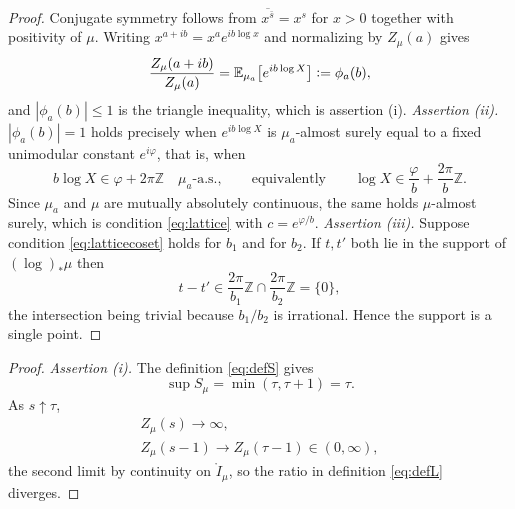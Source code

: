 \documentclass[sn-mathphys-num]{sn-jnl}
\theoremstyle{thmstyleone}%
\theoremstyle{thmstyletwo}%
\theoremstyle{thmstylethree}%
\theoremstyle{thmstyleone}%
\providecommand{\Z}{\mathbb{Z}}
\providecommand{\E}{\mathbb{E}}
\providecommand{\eqdef}{\mathrel{\vcentcolon=}}
\begin{document}
\begin{appendices}
		
		\propmodulus*
		
		\begin{proof}
			Conjugate symmetry follows from $\overline{x^{\bar s}}=x^{s}$ for
			$x>0$ together with positivity of $\mu$. Writing
			$x^{a+ib}=x^{a}e^{ib\log x}$ and normalizing by $Z_\mu(a)$ gives
			\begin{equation}\label{eq:phia}
				\frac{Z_\mu(a+ib)}{Z_\mu(a)}
				=\E_{\mu_a}\bigl[e^{ib\log X}\bigr]\eqdef\phi_a(b),
			\end{equation}
			and $|\phi_a(b)|\le1$ is the triangle inequality, which is
			assertion (i). \emph{Assertion (ii).} $|\phi_a(b)|=1$ holds precisely
			when $e^{ib\log X}$ is $\mu_a$-almost surely equal to a fixed
			unimodular constant $e^{i\varphi}$, that is, when
			\begin{equation}\label{eq:latticecoset}
				b\log X\in\varphi+2\pi\Z\quad\mu_a\text{-a.s.},
				\qquad\text{equivalently}\qquad
				\log X\in\frac{\varphi}{b}+\frac{2\pi}{b}\Z .
			\end{equation}
			Since $\mu_a$ and $\mu$ are mutually absolutely continuous, the
			same holds $\mu$-almost surely, which is condition \eqref{eq:lattice} with
			$c=e^{\varphi/b}$. \emph{Assertion (iii).} Suppose
			condition \eqref{eq:latticecoset} holds for $b_1$ and for $b_2$. If $t,t'$
			both lie in the support of $(\log)_*\mu$ then
			\begin{equation}\label{eq:incommensurable}
				t-t'\in\frac{2\pi}{b_1}\Z\cap\frac{2\pi}{b_2}\Z=\{0\},
			\end{equation}
			the intersection being trivial because $b_1/b_2$ is irrational.
			Hence the support is a single point.
		\end{proof}
		\propendpoints*
		
		\begin{proof}
			\emph{Assertion (i).} The definition \eqref{eq:defS} gives
			\begin{equation}\label{eq:supS}
				\sup S_\mu=\min(\tau,\tau+1)=\tau .
			\end{equation}
			As $s\uparrow\tau$,
			\begin{equation}\label{eq:rightlimits}
				\begin{gathered}
					Z_\mu(s)\longrightarrow\infty,\\
					Z_\mu(s-1)\longrightarrow Z_\mu(\tau-1)\in(0,\infty),
				\end{gathered}
			\end{equation}
			the second limit by continuity on $\mathring I_\mu$, so the ratio in
			definition \eqref{eq:defL} diverges.
			

\end{proof}
\end{appendices}
\end{document}
